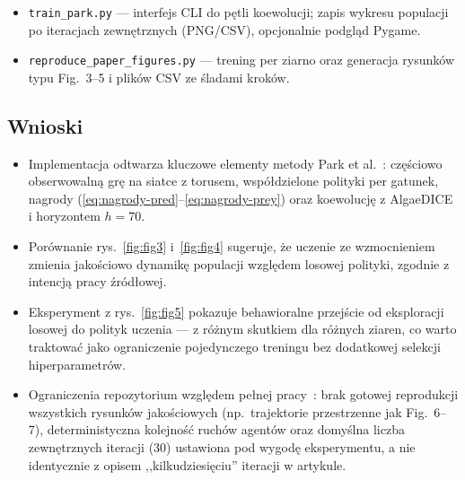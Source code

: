 \documentclass[polish]{template/projectreport}
\begin{document}
\begin{itemize}
  \item \texttt{train\_park.py} --- interfejs CLI do pętli koewolucji; zapis wykresu populacji po iteracjach zewnętrznych (PNG/CSV), opcjonalnie podgląd Pygame.
  \item \texttt{reproduce\_paper\_figures.py} --- trening per ziarno oraz generacja rysunków typu Fig.~3--5 i plików CSV ze śladami kroków.
\end{itemize}

\subsection{Wnioski}
\label{sec:wnioski}

\begin{itemize}
  \item Implementacja odtwarza kluczowe elementy metody Park et al.~\cite{park2021}: częściowo obserwowalną grę na siatce z torusem, współdzielone polityki per gatunek, nagrody (\eqref{eq:nagrody-pred}--\eqref{eq:nagrody-prey}) oraz koewolucję z AlgaeDICE i horyzontem \(h=70\).
  \item Porównanie rys.~\ref{fig:fig3} i~\ref{fig:fig4} sugeruje, że uczenie ze wzmocnieniem zmienia jakościowo dynamikę populacji względem losowej polityki, zgodnie z intencją pracy źródłowej.
  \item Eksperyment z rys.~\ref{fig:fig5} pokazuje behawioralne przejście od eksploracji losowej do polityk uczenia --- z różnym skutkiem dla różnych ziaren, co warto traktować jako ograniczenie pojedynczego treningu bez dodatkowej selekcji hiperparametrów.
  \item Ograniczenia repozytorium względem pełnej pracy~\cite{park2021}: brak gotowej reprodukcji wszystkich rysunków jakościowych (np.\ trajektorie przestrzenne jak Fig.~6--7), deterministyczna kolejność ruchów agentów oraz domyślna liczba zewnętrznych iteracji (30) ustawiona pod wygodę eksperymentu, a nie identycznie z opisem ,,kilkudziesięciu'' iteracji w artykule.
\end{itemize}
\end{document}
